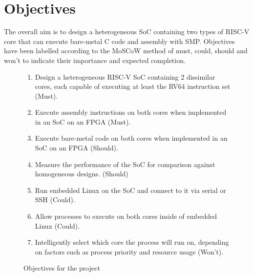 \clearpage

\section{Objectives}
The overall aim is to design a heterogeneous SoC containing two types of RISC-V core that can execute bare-metal C code and assembly with SMP. Objectives have been labelled according to the MoSCoW method\cite{case-method-fasttrack} of must, could, should and won't to indicate their importance and expected completion.
\begin{figure}[h!]
    \centering
    \begin{enumerate}
        \item Design a heterogeneous RISC-V SoC containing 2 dissimilar cores, each capable of executing at least the RV64 instruction set (Must).
        \item Execute assembly instructions on both cores when implemented in an SoC on an FPGA (Must).
        \item Execute bare-metal code on both cores when implemented in an SoC on an FPGA (Should).
        \item Measure the performance of the SoC for comparison against homogeneous designs. (Should)
        \item Run embedded Linux on the SoC and connect to it via serial or SSH (Could).
        \item Allow processes to execute on both cores inside of embedded Linux (Could).
        \item Intelligently select which core the process will run on, depending on factors such as process priority and resource usage (Won't).
    \end{enumerate}
    \caption{Objectives for the project}
    \label{fig:objectives}
\end{figure}